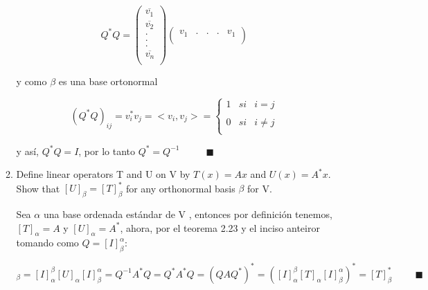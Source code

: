\documentclass[12pt,a4paper]{article}
\begin{document}
\begin{enumerate}
\begin{enumerate}
        \begin{equation*}
            Q^* Q =\begin{pmatrix}
            \overline{v_1} \\
            \overline{v_2} \\
            . \\
            . \\
            . \\
            \overline{v_n}\\
            \end{pmatrix}
            \begin{pmatrix}
             v_1 & . & . & . & v_1\\
             \end{pmatrix}
        \end{equation*}
        
        y como  $\beta$ es una base ortonormal
        
        \begin{equation*}
            (Q^* Q)_{ij} = v_i ^* v_j = <v_i, v_j> = \left\{ \begin{array}{lcc}
             1 &   si  & i = j\\
             \\ 0 &  si & i \neq j \\
             \end{array}
        \right.
        \end{equation*}
        
        y así, $Q^*Q = I$, por lo tanto $Q^*=Q^{-1}$ $\hspace{1cm} \blacksquare$
        
        \item Define linear operators T and U on V by $T(x) = Ax$ and $U(x) = A^*x$. Show that $[U]_\beta = [T]_\beta ^*$ for any orthonormal basis $\beta$ for V.
        
        Sea $\alpha$ una base ordenada estándar de V  , entonces por definición tenemos, $[T]_\alpha =A$ y $[U]_\alpha = A^*$, ahora, por el teorema 2.23 y el inciso anteiror tomando como $Q =[I]_{\beta}^{\alpha} $:
        
        \begin{equation*}
            [U]_\beta = [I]_{\alpha} ^{\beta} [U]_\alpha  [I]_{\beta}^{\alpha} = Q^{-1} A^* Q =Q^* A^* Q = (Q A Q^*)^* = ([I]_{\alpha} ^{\beta} [T]_\alpha  [I]_{\beta}^{\alpha})^* = [T]_{\beta}^* \hspace{1cm} \blacksquare
        \end{equation*}
        

\end{enumerate}
\end{enumerate}
\end{document}
